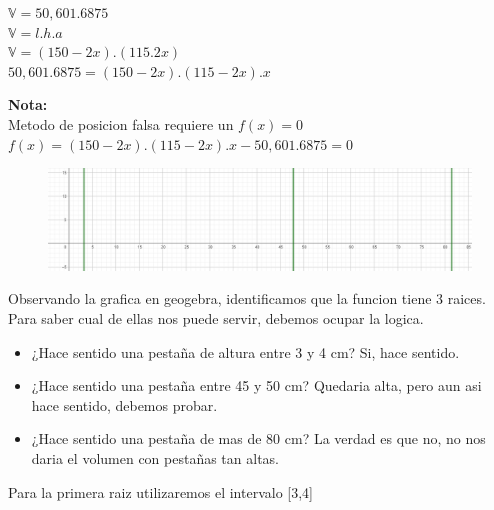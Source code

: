 \documentclass{article}
\theoremstyle{mytheoremstyle}
\theoremstyle{mytheoremstyle}
\theoremstyle{myproblemstyle}
\begin{document}
\noindent $\mathbb{V} = 50,601.6875$
\\$\mathbb{V} = l.h.a$
\\$\mathbb{V} = (150-2x).(115.2x)$
\\$50,601.6875 = (150-2x).(115-2x).x$

\noindent \textbf{Nota: }\\Metodo de posicion falsa requiere un $f(x)=0$
\\ $f(x)=(150-2x).(115-2x).x-50,601.6875=0$

\begin{figure}[ht]
    \includegraphics*[scale=0.5]{img/secante2.png}
\end{figure}
Observando la grafica en geogebra, identificamos que la funcion tiene 3 raices. Para saber cual de ellas nos puede servir, debemos ocupar la logica.
\begin{itemize}
    \item ¿Hace sentido una pestaña de altura entre 3 y 4 cm? Si, hace sentido.
    \item ¿Hace sentido una pestaña entre 45 y 50 cm? Quedaria alta, pero aun asi hace sentido, debemos probar.
    \item ¿Hace sentido una pestaña de mas de 80 cm? La verdad es que no, no nos daria el volumen con pestañas tan altas.
\end{itemize}

Para la primera raiz utilizaremos el intervalo [3,4]
\end{document}
